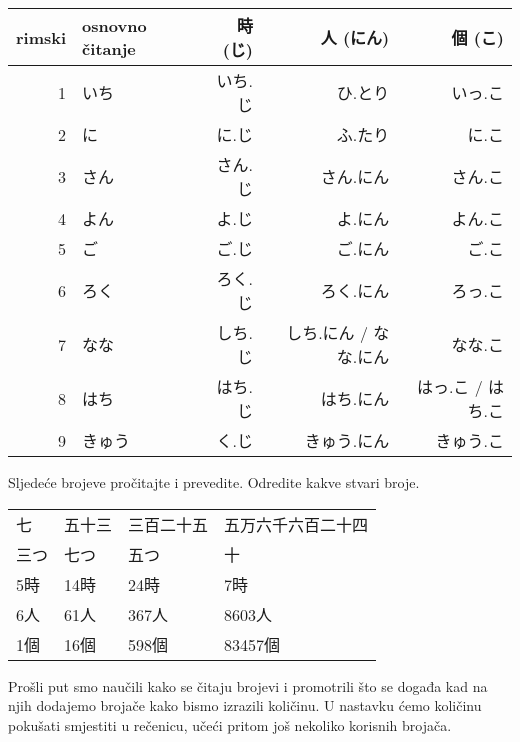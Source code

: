 	\begin{table}[h]
		\centering
		\begin{tabular}{r l r r r}\toprule[2pt]
			rimski & osnovno čitanje & 時 (じ) & 人 (にん) & 個 (こ)\\
			\midrule
			1			& いち & いち.じ & ひ.とり\footnotemark[2] & \colorbox{blue!10}{いっ.こ} \\
			2			& に & に.じ & ふ.たり\footnotemark[2] & に.こ \\
			3			& さん & さん.じ & さん.にん & さん.こ \\
			4			& よん & \colorbox{blue!10}{よ.じ} & \colorbox{blue!10}{よ.にん} & よん.こ \\
			5			& ご & ご.じ & ご.にん & ご.こ \\
			6			& ろく & ろく.じ & ろく.にん & \colorbox{blue!10}{ろっ.こ} \\
			7			& なな & \colorbox{blue!10}{しち.じ} & しち.にん / なな.にん & なな.こ \\
			8			& はち & はち.じ & はち.にん & \colorbox{blue!10}{はっ.こ} / はち.こ \\
			9			& きゅう & \colorbox{blue!10}{く.じ} & きゅう.にん & きゅう.こ \\
			\bottomrule
		\end{tabular}
	\end{table}

	
	Sljedeće brojeve pročitajte i prevedite. Odredite kakve stvari broje.
	
	\vspace{5pt}
	\begin{tabular}{l l l l}
		七	&	五十三	&	三百二十五	&	五万六千六百二十四	\\
		三つ	&	七つ	&	五つ			&	十	\\
		5時	&	14時	&	24時			&	7時	\\
		6人	&	61人	&	367人		&	8603人	\\
		1個	&	16個	&	598個		&	83457個	\\
	\end{tabular}

	
\newpage
{}

	
	Prošli put smo naučili kako se čitaju brojevi i promotrili što se događa kad na njih dodajemo brojače kako bismo izrazili količinu. U nastavku ćemo količinu pokušati smjestiti u rečenicu, učeći pritom još nekoliko korisnih brojača.
	
